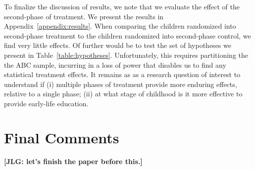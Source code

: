 



\noindent To finalize the discussion of results, we note that we evaluate the effect of the second-phase of treatment. We present the results in Appendix~\ref{appendix:results}. When comparing the children randomized into second-phase treatment to the children randomized into second-phase control, we find very little effects. Of further would be to test the set of hypotheses we present in Table~\ref{table:hypotheses}. Unfortunately, this requires partitioning the the ABC sample, incurring in a loss of power that disables us to find any statistical treatment effects. It remains as as a research question of interest to understand if (i) multiple phases of treatment provide more enduring effects, relative to a single phase; (ii) at what stage of childhood is it more effective to provide early-life education. 

\section{Final Comments} \label{section:conclusion}

\noindent \textbf{[JLG: let's finish the paper before this.]}

\clearpage
\singlespace



 